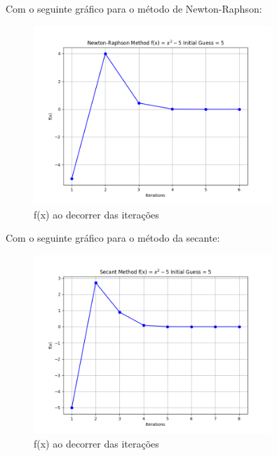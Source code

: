 \documentclass[12pt, a4paper]{article} %
\begin{document}
            Com o seguinte gr\'afico para o m\'etodo de Newton-Raphson:
            \begin{figure}[H]
                \centering
                \includegraphics[width=0.8\textwidth]{../images/grafic-ex-2-newton-raphson-method-5.png}
                \caption{f(x) ao decorrer das itera\c{c}\~oes}
            \end{figure}
            Com o seguinte gr\'afico para o m\'etodo da secante:
            \begin{figure}[H]
                \centering
                \includegraphics[width=0.8\textwidth]{../images/grafic-ex-2-secant-method-5.png}
                \caption{f(x) ao decorrer das itera\c{c}\~oes}
            \end{figure}
\end{document}
